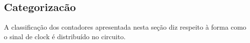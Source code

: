 \subsection{Categorizacão}

A classificação dos contadores apresentada nesta seção diz respeito à forma como o sinal de clock é distribuído no circuito.




